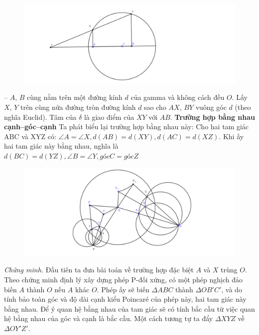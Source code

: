 \begin{multicols}{2}
\begin{figure}[H]
		\vspace*{-5pt}
		\centering
		\captionsetup{labelformat= empty, justification=centering}
		\includegraphics[width= 1\linewidth]{TH 4 định lý xây dựng.pdf}
		\vspace*{-10pt}
	\end{figure}
	-- $A$, $B$ cùng nằm trên một đường kính $d$ của gamma và không cách đều $O$. Lấy $X$, $Y$ trên cùng nửa đường tròn đường kính $d$ sao cho $AX$, $BY$ vuông góc $d$ (theo nghĩa Euclid). Tâm của $\delta$ là giao điểm của $XY$ với $AB$.
	\vskip 0.1cm
	\textbf{\color{lichsutoanhoc}Trường hợp bằng nhau cạnh--góc--cạnh}
	\vskip 0.1cm
	Ta phát biểu lại trường hợp bằng nhau này:
	Cho hai tam giác ABC và XYZ có: $ \angle A = \angle X, d(AB) = d(XY), d(AC) = d(XZ)$.
	Khi ấy hai tam giác này bằng nhau, nghĩa là $d(BC)  = d(YZ), \angle B = \angle Y, góc C = góc Z$
	\begin{figure}[H]
		\vspace*{-5pt}
		\centering
		\captionsetup{labelformat= empty, justification=centering}
		\includegraphics[width= 1\linewidth]{Trường hợp cgc.pdf}
		\vspace*{-10pt}
	\end{figure}
	\textit{Chứng minh.} Đầu tiên ta đưa bài toán về trường hợp đặc biệt $A$ và $X$ trùng $O$.
	Theo chứng minh định lý xây dựng phép P-đối xứng, có một phép nghịch đảo biến $A$ thành $O$ nếu $A$ khác $O$. Phép ấy sẽ biến $\Delta ABC$ thành $\Delta OB'C'$, và do tính bảo toàn góc và độ dài cạnh kiểu Poincaré của phép này, hai tam giác này bằng nhau. Để ý quan hệ bằng nhau của tam giác sẽ có tính bắc cầu từ việc quan hệ bằng nhau của góc và cạnh là bắc cầu. Một cách tương tự ta đẩy $\Delta XYZ$ về $ \Delta OY'Z'$.

\end{multicols}
